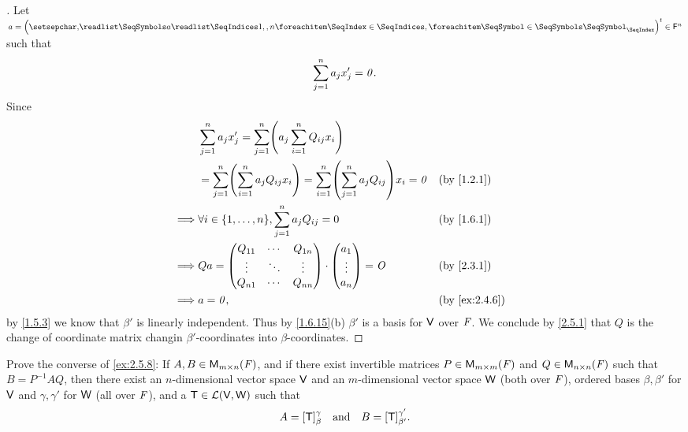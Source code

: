 \begin{proof}[]
  Let \(a = \tp{\tuple{a}{1,,n}} \in \vs{F}^n\) such that
  \[
    \sum_{j = 1}^n a_j x_j' = \mathit{0}.
  \]
  Since
  \begin{align*}
             & \sum_{j = 1}^n a_j x_j' = \sum_{j = 1}^n \pa{a_j \sum_{i = 1}^n Q_{i j} x_i}                                                                           \\
             & = \sum_{j = 1}^n \pa{\sum_{i = 1}^n a_j Q_{i j} x_i} = \sum_{i = 1}^n \pa{\sum_{j = 1}^n a_j Q_{i j}} x_i = \zv &  & \text{(by \cref{1.2.1})}          \\
    \implies & \forall i \in \set{1, \dots, n}, \sum_{j = 1}^n a_j Q_{i j} = 0                                                 &  & \text{(by \cref{1.6.1})}          \\
    \implies & Qa = \begin{pmatrix}
                      Q_{1 1} & \cdots & Q_{1 n} \\
                      \vdots  & \ddots & \vdots  \\
                      Q_{n 1} & \cdots & Q_{n n}
                    \end{pmatrix} \cdot \begin{pmatrix}
                                          a_1    \\
                                          \vdots \\
                                          a_n
                                        \end{pmatrix} = \zm                                                                             &  & \text{(by \cref{2.3.1})} \\
    \implies & a = \zv,                                                                                                        &  & \text{(by \cref{ex:2.4.6})}
  \end{align*}
  by \cref{1.5.3} we know that \(\beta'\) is linearly independent.
  Thus by \cref{1.6.15}(b) \(\beta'\) is a basis for \(\mathsf{V}\) over \(\mathit{F}\).
  We conclude by \cref{2.5.1} that \(Q\) is the change of coordinate matrix changin \(\beta'\)-coordinates into \(\beta\)-coordinates.
\end{proof}

\begin{ex}\label{ex:2.5.14}
  Prove the converse of \cref{ex:2.5.8}:
  If \(A, B \in \mathsf{M}_{{m} \times n}({\mathit{F}})\), and if there exist invertible matrices \(P \in \mathsf{M}_{{m} \times m}({\mathit{F}})\) and \(Q \in \mathsf{M}_{{n} \times n}({\mathit{F}})\) such that \(B = P^{-1} A Q\), then there exist an \(n\)-dimensional vector space \(\mathsf{V}\) and an \(m\)-dimensional vector space \(\mathsf{W}\) (both over \(\mathit{F}\)), ordered bases \(\beta, \beta'\) for \(\mathsf{V}\) and \(\gamma, \gamma'\) for \(\mathsf{W}\) (all over \(\mathit{F}\)), and a \(\mathsf{T} \in \mathcal{L}(\mathsf{V}, \mathsf{W})\) such that
  \[
    A = [\mathsf{T}]_{\beta}^{\gamma} \quad \text{and} \quad B = [\mathsf{T}]_{\beta'}^{\gamma'}.
  \]
\end{ex}

